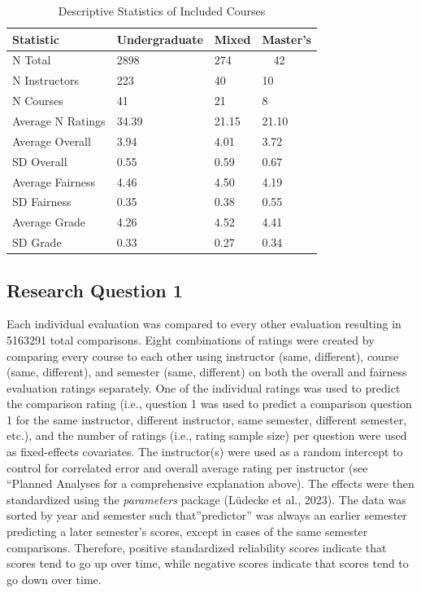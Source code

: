 \documentclass[
  man]{apa7}
\begin{document}
\begin{table}[tbp]

\begin{center}
\begin{threeparttable}

\caption{\label{tab:table1}Descriptive Statistics of Included Courses}

\begin{tabular}{llll}
\toprule
Statistic & Undergraduate & Mixed & Master's\\
\midrule
N Total & 2898 & 274 & \ \ 42\\
N Instructors & 223 & 40 & 10\\
N Courses & 41 & 21 & 8\\
Average N Ratings & 34.39 & 21.15 & 21.10\\
Average Overall & 3.94 & 4.01 & 3.72\\
SD Overall & 0.55 & 0.59 & 0.67\\
Average Fairness & 4.46 & 4.50 & 4.19\\
SD Fairness & 0.35 & 0.38 & 0.55\\
Average Grade & 4.26 & 4.52 & 4.41\\
SD Grade & 0.33 & 0.27 & 0.34\\
\bottomrule
\end{tabular}

\end{threeparttable}
\end{center}

\end{table}

\subsection{Research Question 1}\label{research-question-1-1}

Each individual evaluation was compared to every other evaluation
resulting in 5163291 total comparisons. Eight combinations of
ratings were created by comparing every course to each other using
instructor (same, different), course (same, different), and semester
(same, different) on both the overall and fairness evaluation ratings
separately. One of the individual ratings was used to predict the
comparison rating (i.e., question 1 was used to predict a comparison
question 1 for the same instructor, different instructor, same semester,
different semester, etc.), and the number of ratings (i.e., rating
sample size) per question were used as fixed-effects covariates. The
instructor(s) were used as a random intercept to control for correlated
error and overall average rating per instructor (see ``Planned Analyses for a comprehensive explanation above). The effects were then standardized using
the \emph{parameters} package (Lüdecke et al., 2023). The data was sorted by year and
semester such that''predictor'' was always an earlier semester predicting
a later semester's scores, except in cases of the same semester
comparisons. Therefore, positive standardized reliability scores
indicate that scores tend to go up over time, while negative scores
indicate that scores tend to go down over time.
\end{document}
